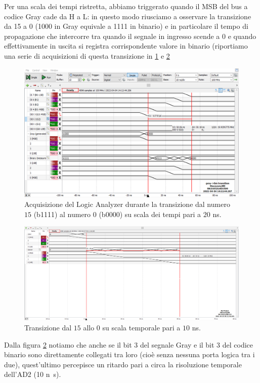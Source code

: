 \documentclass[10pt, a4paper, italian]{article}
\begin{document}
Per una scala dei tempi ristretta, abbiamo triggerato quando il MSB del bus a
codice Gray cade da H a L: in questo modo riusciamo a osservare la transizione
da 15 a 0 (1000 in Gray equivale a 1111 in binario) e in particolare il tempo
di propagazione che intercorre tra quando il segnale in ingresso scende a 0
e quando effettivamente in uscita si registra corrispondente valore in binario
(riportiamo una serie di acquisizioni di questa transizione in
\cref{fig: gray20ns} e \cref{fig: prop}
\begin{figure}[htbp]
    \centering
    \includegraphics[width=\textwidth]{gray20ns_B}
    \caption{Acquisizione del Logic Analyzer durante la transizione dal numero
    $15$ (b1111) al numero $0$ (b0000) su scala dei tempi pari a $20$ ns.
    \label{fig: gray20ns}}
\end{figure}
\begin{figure}[htbp]
    \centering
    \includegraphics[width=\textwidth]{gray10ns}
    \caption{Transizione dal $15$ allo $0$ su scala temporale pari a $10$ ns.
    \label{fig: prop}}
\end{figure}

Dalla figura \cref{fig: prop} notiamo che anche se il bit 3 del segnale Gray e
il bit 3 del codice binario sono direttamente collegati tra loro
(cioè senza nessuna porta logica tra i due), quest'ultimo percepisce un
ritardo pari a circa la risoluzione temporale dell'AD2 (10 \si{n\s}).
\end{document}
